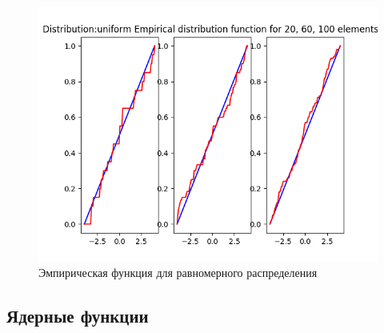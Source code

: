 \documentclass[12pt]{article}
\begin{document}
\begin{center}
\begin{figure}[H]
 \caption{Эмпирическая функция для равномерного распределения }
\includegraphics[width=\textwidth]{empiric/uniform.png}
\end{figure}
\end{center}
\subsection{Ядерные функции}
\end{document}
